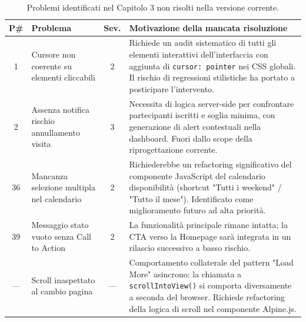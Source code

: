 \begin{table}[H]
\centering
\renewcommand{\arraystretch}{1.5}
\small
\begin{tabularx}{\textwidth}{|c|X|c|X|}
\hline
\textbf{P\#} & \textbf{Problema} & \textbf{Sev.} & \textbf{Motivazione della mancata risoluzione} \\ \hline
1  & Cursore non coerente su elementi cliccabili & 2 & Richiede un audit sistematico di tutti gli elementi interattivi dell'interfaccia con aggiunta di \texttt{cursor: pointer} nei CSS globali. Il rischio di regressioni stilistiche ha portato a posticipare l'intervento. \\ \hline
2  & Assenza notifica rischio annullamento visita & 3 & Necessita di logica server-side per confrontare partecipanti iscritti e soglia minima, con generazione di alert contestuali nella dashboard. Fuori dallo scope della riprogettazione corrente. \\ \hline
36 & Mancanza selezione multipla nel calendario  & 2 & Richiederebbe un refactoring significativo del componente JavaScript del calendario disponibilità (shortcut "Tutti i weekend" / "Tutto il mese"). Identificato come miglioramento futuro ad alta priorità. \\ \hline
39 & Messaggio stato vuoto senza Call to Action  & 2 & La funzionalità principale rimane intatta; la CTA verso la Homepage sarà integrata in un rilascio successivo a basso rischio. \\ \hline
—  & Scroll inaspettato al cambio pagina         & — & Comportamento collaterale del pattern "Load More" asincrono: la chiamata a \texttt{scrollIntoView()} si comporta diversamente a seconda del browser. Richiede refactoring della logica di scroll nel componente Alpine.js. \\ \hline
\end{tabularx}
\caption{Problemi identificati nel Capitolo 3 non risolti nella versione corrente.}
\label{tab:problemi_aperti}
\end{table}
